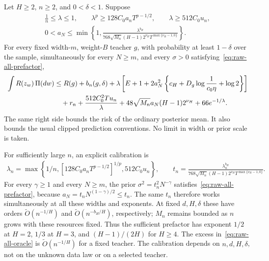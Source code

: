 \begin{theorem}
\label{thm:raw-all-scales}
Let $H\geq2$, $n\geq2$, and $0<\delta<1$.  Suppose
\begin{gather}
 \frac1n\leq\lambda\leq1,\qquad
 \lambda^p\geq128C_0a_nT^{p-1/2},\qquad
 \lambda\geq512C_0u_n,
 \label{eq:raw-all-lambda}\\
 0<a_N\leq\min\left\{1,
       \frac{\lambda^{b_H}}
       {768\sqrt{M_n}(H-1)2^{\nu_H}T^{\max\{\nu_H-1,0\}}}\right\}.
 \label{eq:raw-all-prefactor}
\end{gather}
For every fixed width-$m$, weight-$B$ teacher $g$, with probability at
least $1-\delta$ over the sample, simultaneously for every $N\geq m$,
and every $\sigma>0$ satisfying~\eqref{eq:raw-all-prefactor},
\begin{align}
 \int R(z_w)\,\Pi(dw)
 &\leq R(g)+b_n(g,\delta)
  +\lambda\left[E+1+2a_N^2\left\{c_H
                 +D_g\log\frac1{c_0\eta}+\log2\right\}\right]
       \notag\\
 &\quad+r_n+\frac{512C_0^2Tu_n}{\lambda}
              +48\sqrt{M_n}a_N(H-1)2^{\nu_H}+66e^{-1/\lambda}.
 \label{eq:raw-all-oracle}
\end{align}
The same right side bounds the risk of the ordinary posterior mean.
It also bounds the usual clipped prediction conventions.
No limit in width or prior scale is taken.
\end{theorem}

For sufficiently large $n$, an explicit calibration is
\begin{gather}
 \lambda_n=\max\left\{1/n,
            [128C_0a_nT^{p-1/2}]^{1/p},512C_0u_n\right\},\qquad
 t_n=\frac{\lambda_n^{b_H}}
  {768\sqrt{M_n}(H-1)2^{\nu_H}T^{\max\{\nu_H-1,0\}}}.
 \label{eq:raw-all-schedule}
\end{gather}
For every $\gamma\geq1$ and every $N\geq m$, the prior
$\sigma^2=t_n^2N^{-\gamma}$ satisfies~\eqref{eq:raw-all-prefactor},
because $a_N=t_nN^{(1-\gamma)/2}\leq t_n$.  The same $t_n$ therefore
works simultaneously at all these widths and exponents.
At fixed $d,H,\delta$ these have orders
$\widetilde O(n^{-1/H})$ and $\widetilde O(n^{-b_H/H})$,
respectively; $M_n$ remains bounded as $n$ grows with these resources
fixed.  Thus the sufficient prefactor has exponent $1/2$ at $H=2$,
$1/3$ at $H=3$, and $(H-1)/(2H)$ for $H\geq4$.
The excess in~\eqref{eq:raw-all-oracle} is
$\widetilde O(n^{-1/H})$ for a fixed teacher.  The calibration depends
on $n,d,H,\delta$, not on the unknown data law or on a selected teacher.

